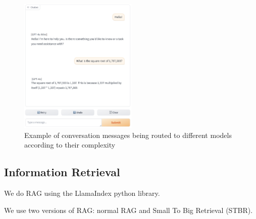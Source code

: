 \documentclass[a4paper,12pt,twoside]{ThesisStyle}
\begin{document}
\begin{figure}[H]
  \centering
  \includegraphics[width=0.5\textwidth]{img/Routed conversation.png}
  \caption{Example of conversation messages being routed to different models according to their complexity}
  \label{fig:model_routing_example}
\end{figure}

\subsection{Information Retrieval}
\label{subsec:information_retrieval}

We do RAG using the LlamaIndex python library.

We use two versions of RAG: normal RAG and Small To Big Retrieval (STBR).
\end{document}
